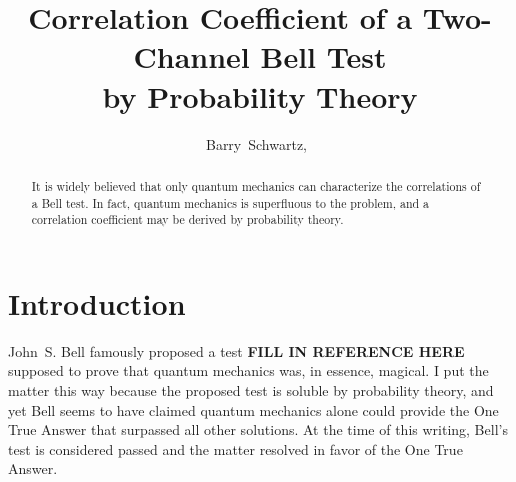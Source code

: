 \documentclass[9pt,technote]{IEEEtran}
\begin{document}
\title{Correlation Coefficient of a Two-Channel Bell Test\\by
  Probability Theory}
\author{Barry~Schwartz,~}

\maketitle
\insert{}

\begin{abstract}
  It is widely believed that only quantum mechanics can characterize
  the correlations of a Bell test. In fact, quantum mechanics is
  superfluous to the problem, and a correlation coefficient may be
  derived by probability theory.
\end{abstract}

\section{Introduction}

John~S. Bell famously proposed a test {\bf{FILL IN REFERENCE HERE}}
supposed to prove that quantum mechanics was, in essence, magical. I
put the matter this way because the proposed test is soluble by
probability theory, and yet Bell seems to have claimed quantum
mechanics alone could provide the One True Answer that surpassed all
other solutions. At the time of this writing, Bell's test is
considered passed and the matter resolved in favor of the One True
Answer.
\end{document}
